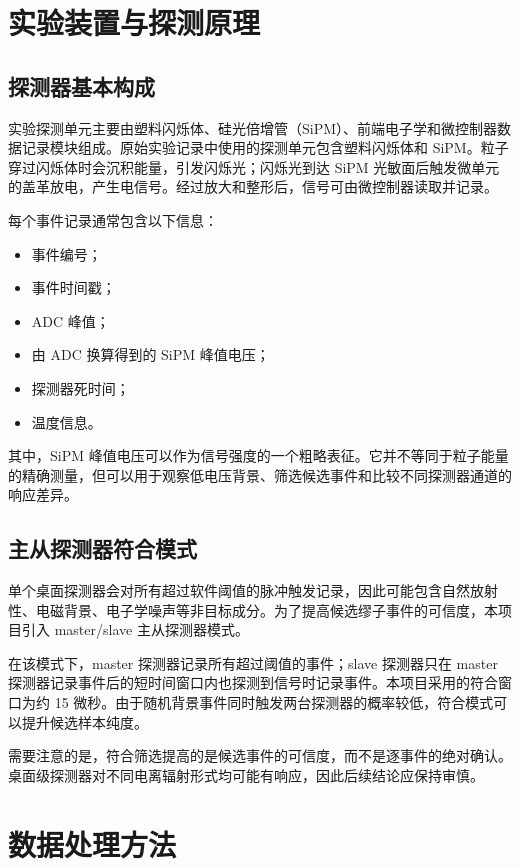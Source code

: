 \documentclass[11pt,a4paper]{ctexart}
\begin{document}
\section{实验装置与探测原理}

\subsection{探测器基本构成}

实验探测单元主要由塑料闪烁体、硅光倍增管（SiPM）、前端电子学和微控制器数据记录模块组成。原始实验记录中使用的探测单元包含塑料闪烁体和 SiPM。粒子穿过闪烁体时会沉积能量，引发闪烁光；闪烁光到达 SiPM 光敏面后触发微单元的盖革放电，产生电信号。经过放大和整形后，信号可由微控制器读取并记录。

每个事件记录通常包含以下信息：

\begin{itemize}
  \item 事件编号；
  \item 事件时间戳；
  \item ADC 峰值；
  \item 由 ADC 换算得到的 SiPM 峰值电压；
  \item 探测器死时间；
  \item 温度信息。
\end{itemize}

其中，SiPM 峰值电压可以作为信号强度的一个粗略表征。它并不等同于粒子能量的精确测量，但可以用于观察低电压背景、筛选候选事件和比较不同探测器通道的响应差异。

\subsection{主从探测器符合模式}

单个桌面探测器会对所有超过软件阈值的脉冲触发记录，因此可能包含自然放射性、电磁背景、电子学噪声等非目标成分。为了提高候选缪子事件的可信度，本项目引入 master/slave 主从探测器模式。

在该模式下，master 探测器记录所有超过阈值的事件；slave 探测器只在 master 探测器记录事件后的短时间窗口内也探测到信号时记录事件。本项目采用的符合窗口为约 15 微秒。由于随机背景事件同时触发两台探测器的概率较低，符合模式可以提升候选样本纯度。

需要注意的是，符合筛选提高的是候选事件的可信度，而不是逐事件的绝对确认。桌面级探测器对不同电离辐射形式均可能有响应，因此后续结论应保持审慎。

\section{数据处理方法}
\end{document}
